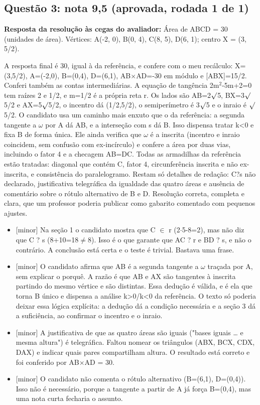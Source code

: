\documentclass{article}%
\begin{document}
\subsection*{Questão 3: nota 9,5 (aprovada, rodada 1 de 1)}%
\textbf{Resposta da resolução às cegas do avaliador:} Área de ABCD = 30 (unidades de área). Vértices: A(-2, 0), B(0, 4), C(8, 5), D(6, 1); centro X = (3, 5/2).\par %
A resposta final é 30, igual à da referência, e confere com o meu recálculo: X=(3,5/2), A=(-2,0), B=(0,4), D=(6,1), AB$\times$AD=-30 em módulo e {[}ABX{]}=15/2. Conferi também as contas intermediárias. A equação de tangência 2m$^2$-5m+2=0 tem raízes 2 e 1/2, e m=1/2 é a própria reta r. Os lados são AB=2$\surd$5, BX=3$\surd$5/2 e AX=5$\surd$5/2, o incentro dá (1/2,5/2), o semiperímetro é 3$\surd$5 e o inraio é $\surd$5/2. O candidato usa um caminho mais enxuto que o da referência: a segunda tangente a $\omega$ por A dá AB, e a interseção com s dá B. Isso dispensa tratar k<0 e fixa B de forma única. Ele ainda verifica que $\omega$ é a inscrita (incentro e inraio coincidem, sem confusão com ex{-}incírculo) e confere a área por duas vias, incluindo o fator 4 e a checagem AB=DC. Todas as armadilhas da referência estão tratadas: diagonal que contém C, fator 4, circunferência inscrita e não ex{-}inscrita, e consistência do paralelogramo. Restam só detalhes de redação: C?s não declarado, justificativa telegráfica da igualdade das quatro áreas e ausência de comentário sobre o rótulo alternativo de B e D. Resolução correta, completa e clara, que um professor poderia publicar como gabarito comentado com pequenos ajustes.%
\begin{itemize}%
\item%
{[}minor{]} Na seção 1 o candidato mostra que C $\in$ r (2$\cdot$5-8=2), mas não diz que C ? s (8+10=18$\neq$8). Isso é o que garante que AC ? r e BD ? s, e não o contrário. A conclusão está certa e o teste é trivial. Bastava uma frase.%
\item%
{[}minor{]} O candidato afirma que AB é a segunda tangente a $\omega$ traçada por A, sem explicar o porquê. A razão é que AB e AX são tangentes à inscrita partindo do mesmo vértice e são distintas. Essa dedução é válida, e é ela que torna B único e dispensa a análise k>0/k<0 da referência. O texto só poderia deixar essa lógica explícita: a dedução dá a condição necessária e a seção 3 dá a suficiência, ao confirmar o incentro e o inraio.%
\item%
{[}minor{]} A justificativa de que as quatro áreas são iguais ("bases iguais \ldots{} e mesma altura") é telegráfica. Faltou nomear os triângulos (ABX, BCX, CDX, DAX) e indicar quais pares compartilham altura. O resultado está correto e foi conferido por AB$\times$AD = 30.%
\item%
{[}minor{]} O candidato não comenta o rótulo alternativo (B=(6,1), D=(0,4)). Isso não é necessário, porque a tangente a partir de A já força B=(0,4), mas uma nota curta fecharia o assunto.%
\end{itemize}%
\end{document}
